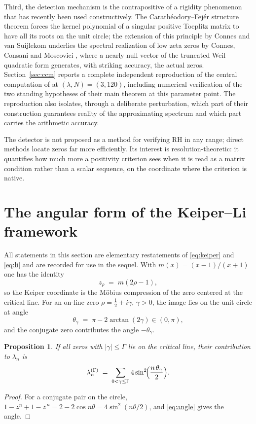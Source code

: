 \documentclass[11pt,oneside]{article}
\newtheorem{proposition}{Proposition}[section]
\theoremstyle{remark}
\begin{document}
Third, the detection mechanism is the contrapositive of a rigidity phenomenon
that has recently been used constructively. The Carath\'eodory--Fej\'er
structure theorem \cite{CF} forces the kernel polynomial of a singular positive
Toeplitz matrix to have all its roots on the unit circle; the extension of this
principle by Connes and van Suijlekom \cite{CvS} underlies the spectral
realization of low zeta zeros by Connes, Consani and Moscovici \cite{CCM},
where a nearly null vector of the truncated Weil quadratic form generates, with
striking accuracy, the actual zeros. Section~\ref{sec:ccm} reports a complete
independent reproduction of the central computation of \cite{CCM} at
$(\lambda, N) = (3, 120)$, including numerical verification of the two standing
hypotheses of their main theorem at this parameter point. The reproduction also
isolates, through a deliberate perturbation, which part of their construction
guarantees reality of the approximating spectrum and which part carries the
arithmetic accuracy.

The detector is not proposed as a method for verifying RH in any range;
direct methods locate zeros far more efficiently. Its interest is
resolution-theoretic: it quantifies how much more a positivity criterion sees
when it is read as a matrix condition rather than a scalar sequence, on the
coordinate where the criterion is native.

\section{The angular form of the Keiper--Li framework}\label{sec:angular}

All statements in this section are elementary restatements of
\eqref{eq:keiper} and \eqref{eq:li} and are recorded for use in the sequel.
With $m(x) = (x-1)/(x+1)$ one has the identity
\begin{equation}\label{eq:mobius}
z_\rho \;=\; m(2\rho - 1),
\end{equation}
so the Keiper coordinate is the M\"obius compression of the zero centered at
the critical line. For an on-line zero $\rho = \tfrac12 + i\gamma$, $\gamma>0$,
the image lies on the unit circle at angle
\begin{equation}\label{eq:angle}
\theta_\gamma \;=\; \pi - 2\arctan(2\gamma) \in (0, \pi),
\end{equation}
and the conjugate zero contributes the angle $-\theta_\gamma$.

\begin{samepage}
\begin{proposition}\label{prop:sos}
If all zeros with $|\gamma| \le \Gamma$ lie on the critical line, their
contribution to $\lambda_n$ is
\[
\lambda_n^{(\Gamma)} \;=\; \sum_{0<\gamma\le\Gamma} 4\sin^{2}\!\Bigl(\frac{n\,\theta_\gamma}{2}\Bigr).
\]
\end{proposition}
\begin{proof}
For a conjugate pair on the circle, $1 - z^n + 1 - \bar z^{\,n} =
2 - 2\cos n\theta = 4\sin^2(n\theta/2)$, and \eqref{eq:angle} gives the angle.
\end{proof}
\end{samepage}
\end{document}
